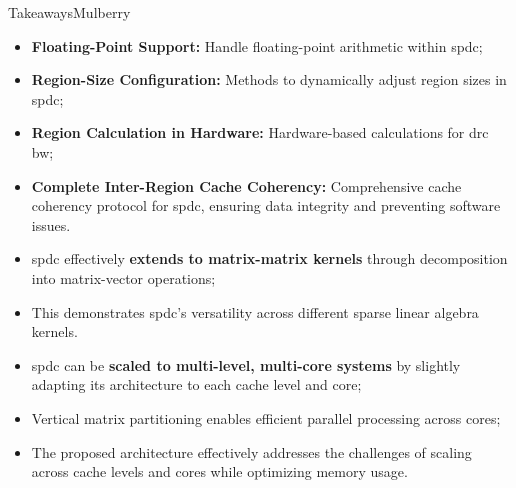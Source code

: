 \begin{highlight}{Takeaways}{Mulberry}
    \begin{itemize}
        \item \textbf{Floating-Point Support:} Handle floating-point arithmetic within \acrlong{spdc};
        \item \textbf{Region-Size Configuration:} Methods to dynamically adjust region sizes in \acrlong{spdc};
        \item \textbf{Region Calculation in Hardware:} Hardware-based calculations for \acrshort{drc} \gls{bw};
        \item \textbf{Complete Inter-Region Cache Coherency:} Comprehensive cache coherency protocol for \acrlong{spdc}, ensuring data integrity and preventing software issues.
    \end{itemize}
    \bigskip
    \begin{itemize}
        \item \acrlong{spdc} effectively \textbf{extends to matrix-matrix kernels} through decomposition into matrix-vector operations;
        \item This demonstrates \acrlong{spdc}'s versatility across different sparse linear algebra kernels.
    \end{itemize}
    \bigskip
    \begin{itemize}
        \item \acrlong{spdc} can be \textbf{scaled to multi-level, multi-core systems} by slightly adapting its architecture to each cache level and core;
        \item Vertical matrix partitioning enables efficient parallel processing across cores;
        \item The proposed architecture effectively addresses the challenges of scaling across cache levels and cores while optimizing memory usage.
    \end{itemize}
\end{highlight}

\clearpage